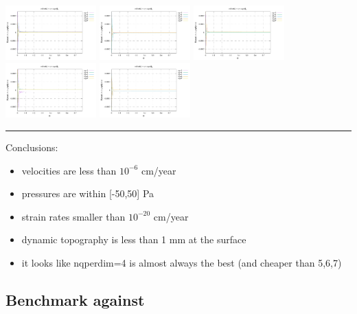 \noindent
\includegraphics[width=3.5cm]{python_codes/fieldstone_152/RESULTS/exp1/d_t_128_m2}
\includegraphics[width=3.5cm]{python_codes/fieldstone_152/RESULTS/exp1/d_t_128_m3}
\includegraphics[width=3.5cm]{python_codes/fieldstone_152/RESULTS/exp1/d_t_128_m4}
\includegraphics[width=3.5cm]{python_codes/fieldstone_152/RESULTS/exp1/d_t_128_m5}
\includegraphics[width=3.5cm]{python_codes/fieldstone_152/RESULTS/exp1/d_t_128_m6}

\hrule

Conclusions:
\begin{itemize}
\item velocities are less than $10^{-6}$ cm/year 
\item pressures are within [-50,50] Pa
\item strain rates smaller than $10^{-20}$ cm/year 
\item dynamic topography is less than 1 mm at the surface 
\item it looks like nqperdim=4 is almost always the best (and cheaper than 5,6,7)
\end{itemize}


\newpage
\subsection*{Benchmark against \aspect}

